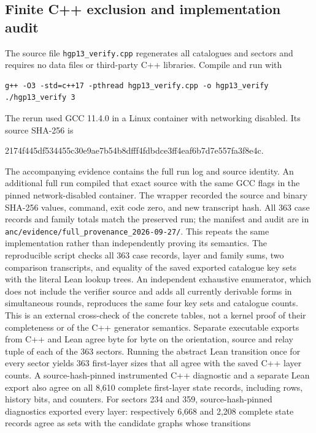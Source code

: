 \documentclass[11pt]{article}
\begin{document}
\subsection*{Finite C++ exclusion and implementation audit}
The source file \texttt{hgp13\_verify.cpp} regenerates all catalogues and
sectors and requires no data files or third-party C++ libraries.
Compile and run with
\begin{lstlisting}[numbers=none]
g++ -O3 -std=c++17 -pthread hgp13_verify.cpp -o hgp13_verify
./hgp13_verify 3
\end{lstlisting}
The rerun used GCC 11.4.0 in a Linux container with networking disabled.
Its source SHA-256 is
\begin{center}\scriptsize\ttfamily
2174f445df534455c30e9ae7b54b8dfff4fdbdce3ff4eaf6b7d7e557fa3f8e4c.
\end{center}
The accompanying evidence contains the full run log and source identity.
An additional full run compiled that exact source with the same GCC flags
in the pinned network-disabled container. The wrapper recorded the source
and binary SHA-256 values, command, exit code zero, and new transcript hash.
All 363 case records and family totals match the preserved run; the
manifest and audit are in
\texttt{anc/evidence/full\_provenance\_2026-09-27/}. This repeats the same
implementation rather than independently proving its semantics.
The reproducible script  checks all 363
case records, layer and family sums, two comparison transcripts, and equality
of the saved exported catalogue key sets with the literal Lean lookup trees.
An independent exhaustive enumerator, which does not include the verifier
source and adds all currently derivable forms in simultaneous rounds,
reproduces the same four key sets and catalogue counts. This is an
external cross-check of the concrete tables, not a kernel proof of their
completeness or of the C++ generator semantics.
Separate executable exports from C++ and Lean agree byte for byte on the
orientation, source and relay tuple of each of the 363 sectors.
Running the abstract Lean transition once for every sector yields 363
first-layer sizes that all agree with the saved C++ layer counts. A
source-hash-pinned instrumented C++ diagnostic and a separate Lean export
also agree on all 8,610 complete first-layer state records, including rows,
history bits, and counters. For sectors 234 and 359, source-hash-pinned
diagnostics exported every layer: respectively 6,668 and 2,208 complete
state records agree as sets with the candidate graphs whose transitions
\end{document}
